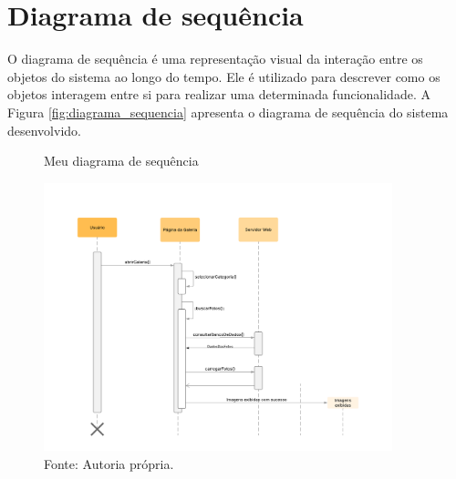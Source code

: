 \section{Diagrama de sequência}
\label{sec:sequencia}   
O diagrama de sequência é uma representação visual da interação entre os objetos do sistema ao longo do tempo. Ele é utilizado para descrever como os objetos interagem entre si para realizar uma determinada funcionalidade. A Figura \ref{fig:diagrama_sequencia} apresenta o diagrama de sequência do sistema desenvolvido. 
\begin{figure} [h!]	
    \centering
    \caption{Meu diagrama de sequência}
    \includegraphics[width=0.9\textwidth]{Figures/Diagrama_de_sequência_básico.png}
    \caption*{Fonte: Autoria própria.}
    \label{fig:diagrama_de_sequencia}
\end{figure}







